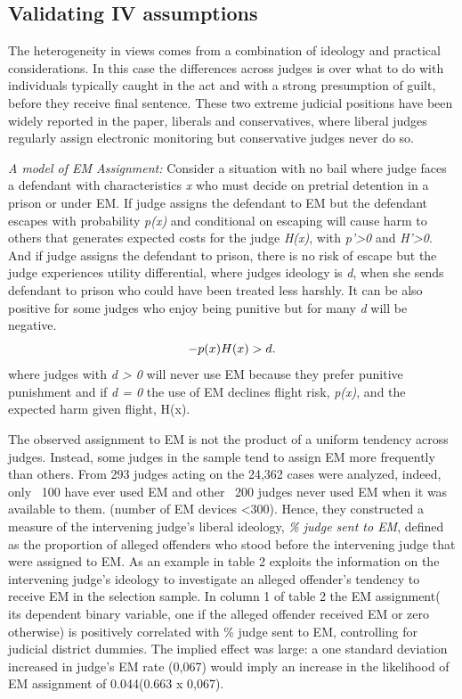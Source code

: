 \documentclass[a4paper,12pt]{article}
\begin{document}
\subsection{Validating IV assumptions}
The heterogeneity in views comes from a combination of ideology and practical considerations. In this case the differences across judges is over what to do with individuals typically caught in the act and with a strong presumption of guilt, before they receive final sentence. These two extreme judicial positions have been widely reported in the paper, liberals and conservatives, where liberal judges regularly assign electronic monitoring but conservative judges never do so. 

\textit{A model of EM Assignment:}
Consider a situation with no bail where judge faces a defendant with characteristics \textit{x} who must decide on pretrial detention in a prison or under EM. If judge assigns the defendant to EM but the defendant escapes with probability \textit{p(x)} and conditional on escaping will cause harm to others that generates expected costs for the judge \textit{H(x)}, with \textit{p'>0} and \textit{H'>0}. And if judge assigns the defendant to prison, there is no risk of escape but the judge experiences utility differential, where judges ideology is \textit{d}, when she sends defendant to prison who could have been treated less harshly. It can be also positive for some judges who enjoy being punitive but for many \textit{d} will be negative. 
\begin{equation}
    \centering
    - p(x)H(x) > d.
\end{equation}
where judges with \textit{d > 0} will never use EM because they prefer punitive punishment and if \textit{d = 0} the use of EM declines flight risk, \textit{p(x)}, and the expected harm given flight, H(x).  

The observed assignment to EM is not the product of a uniform tendency across judges. Instead, some judges in the sample tend to assign EM more frequently than others. From 293 judges acting on the 24,362 cases were analyzed, indeed, only ~100 have ever used EM and other ~200 judges never used EM when it was available to them. (number of EM devices <300). Hence, they constructed a measure of the intervening judge's liberal ideology, \textit{ \% judge sent to EM}, defined as the proportion of alleged offenders who stood before the intervening judge that were assigned to EM. 
As an example in table 2 exploits the information on the intervening judge's ideology to investigate an alleged offender's tendency to receive EM in the selection sample. In column 1 of table 2 the EM assignment( its dependent binary variable, one if the alleged offender received EM or zero otherwise) is positively correlated with \% judge sent to EM, controlling for judicial district dummies. The implied effect was large: a one standard deviation increased in judge's EM rate (0,067) would imply an increase in the likelihood of EM assignment of 0.044(0.663 x 0,067). 
\end{document}
